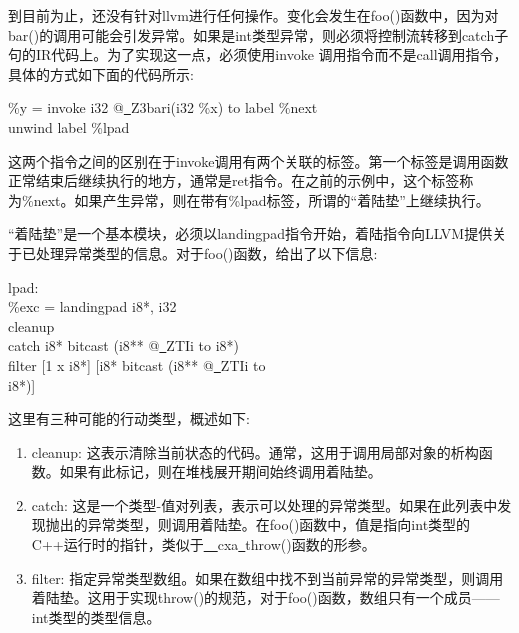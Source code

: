 到目前为止，还没有针对llvm进行任何操作。变化会发生在foo()函数中，因为对bar()的调用可能会引发异常。如果是int类型异常，则必须将控制流转移到catch子句的IR代码上。为了实现这一点，必须使用invoke 调用指令而不是call调用指令，具体的方式如下面的代码所示:\par

\begin{tcolorbox}[colback=white,colframe=black]
\%y = invoke i32 @\underline{~}Z3bari(i32 \%x) to label \%next \\
\hspace*{6cm}unwind label \%lpad
\end{tcolorbox}

这两个指令之间的区别在于invoke调用有两个关联的标签。第一个标签是调用函数正常结束后继续执行的地方，通常是ret指令。在之前的示例中，这个标签称为\%next。如果产生异常，则在带有\%lpad标签，所谓的“着陆垫”上继续执行。\par

“着陆垫”是一个基本模块，必须以landingpad指令开始，着陆指令向LLVM提供关于已处理异常类型的信息。对于foo()函数，给出了以下信息:\par

\begin{tcolorbox}[colback=white,colframe=black]
lpad: \\
\%exc = landingpad { i8*, i32 } \\
\hspace*{3cm}cleanup \\
\hspace*{3cm}catch i8* bitcast (i8** @\underline{~}ZTIi to i8*) \\
\hspace*{3cm}filter [1 x i8*] [i8* bitcast (i8** @\underline{~}ZTIi to  \\
\hspace*{3.5cm}i8*)]
\end{tcolorbox}

这里有三种可能的行动类型，概述如下:\par

\begin{enumerate}
	\item cleanup: 这表示清除当前状态的代码。通常，这用于调用局部对象的析构函数。如果有此标记，则在堆栈展开期间始终调用着陆垫。
	\item catch: 这是一个类型-值对列表，表示可以处理的异常类型。如果在此列表中发现抛出的异常类型，则调用着陆垫。在foo()函数中，值是指向int类型的C++运行时的指针，类似于\underline{~~}cxa\underline{~}throw()函数的形参。
	\item filter: 指定异常类型数组。如果在数组中找不到当前异常的异常类型，则调用着陆垫。这用于实现throw()的规范，对于foo()函数，数组只有一个成员——int类型的类型信息。
\end{enumerate}

